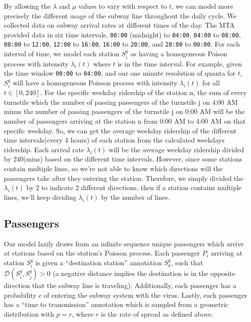 \documentclass[12pt]{article}
\begin{document}
By allowing the $\lambda$ and $\mu$ values to vary with respect to $t$, we can model more precisely the different usage of the subway line throughout the daily cycle. 
We collected data on subway arrival rates at different times of the day.
The MTA provided data\cite{arrival_rate} in six time intervals, \texttt{00:00} (midnight) to \texttt{04:00}, \texttt{04:00} to \texttt{08:00}, \texttt{08:00} to \texttt{12:00}, \texttt{12:00} to \texttt{16:00}, \texttt{16:00} to \texttt{20:00}, and \texttt{20:00} to \texttt{00:00}.
For each interval of time, we model each station $S_i^q$ as having a homogeneous Poison process with intensity $\lambda_i(t)$ where $t$ is in the time interval.
For example, given the time window \texttt{00:00} to \texttt{04:00}, and our one minute resolution of quanta for $t$, $S_i^q$ will have a homogeneous Poisson process with intensity $\lambda_i(t)$ for all $t \in [0, 240]$.
For the specific weekday ridership of the station n, the sum of every turnstile which the number of passing passengers of the turnstile j on 4:00 AM minus the number of passing passengers of the turnstile j on 0:00 AM will be the number of passengers arriving at the station n from 0:00 AM to 4:00 AM on that specific weekday. So, we can get the average weekday ridership of the different time intervals(every 4 hours) of each station from the calculated weekdays ridership. Each arrival rate $\lambda_i(t)$ will be the average weekday ridership divided by 240(mins) based on the different time intervals. However, since some stations contain multiple lines, so we're not able to know which directions will the passengers take after they entering the station. Therefore, we simply divided the  $\lambda_i(t)$ by 2 to indicate 2 different directions, then if a station contains multiple lines, we'll keep dividing $\lambda_i(t)$ by the number of lines.

\subsection{Passengers}

Our model lazily draws from an infinite sequence unique passengers which arrive at stations based on the station's Poisson process. Each passenger $P_i$ arriving at station $S_i^q$ is given a ``destination station'' annotation  $S_k^q$, such that $\mathcal{D}(S_i^q, S_j^q) > 0$ (a negative distance implies the destination is in the opposite direction that the subway line is traveling).
Additionally, each passenger has a probability $c$ of entering the subway system with the virus. Lastly, each passenger has a ``time to transmission'' annotation which is sampled from a geometric distribution with $p=r$, where $r$ is the rate of spread as defined above.
\end{document}
